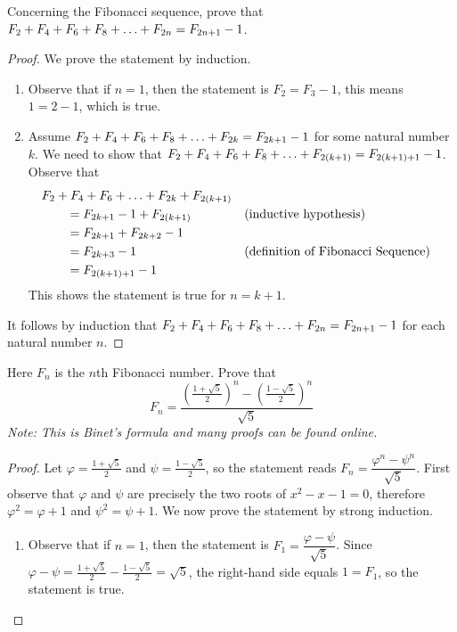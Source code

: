 \documentclass[DIN, pagenumber=false, fontsize=11pt, parskip=half]{scrartcl}
\begin{document}
\begin{problems}
    \problem Concerning the Fibonacci sequence, prove that $F_2 + F_4 + F_6 + F_8 + \mathellipsis + F_{2n} = F_{2n+1}-1$.
    \begin{proof}
        We prove the statement by induction.
        \begin{enumerate}
            \item Observe that if $n=1$, then the statement is $F_2 = F_{3}-1$, this means $1 = 2-1$, which is true.

            \item Assume $F_2 + F_4 + F_6 + F_8 + \mathellipsis + F_{2k} = F_{2k+1}-1$ for some natural number $k$. We need to show that $F_2 + F_4 + F_6 + F_8 + \mathellipsis + F_{2(k+1)} = F_{2(k+1)+1} - 1$. Observe that 
                \begin{align*}
                    \MoveEqLeft F_2+F_4+F_6+\mathellipsis + F_{2k} + F_{2(k+1)}\\
                    & = F_{2k+1} - 1 + F_{2(k+1)} && \text{(inductive hypothesis)}\\
                    & = F_{2k+1} + F_{2k+2} - 1\\
                    & = F_{2k+3} - 1 && \text{(definition of Fibonacci Sequence)}\\
                    & = F_{2(k+1)+1} - 1
                \end{align*}
                This shows the statement is true for $n = k + 1$.
        \end{enumerate}
        It follows by induction that $F_2+F_4+F_6+F_8+\mathellipsis + F_{2n} = F_{2n+1} - 1$ for each natural number $n$.
    \end{proof}

    \problem Here $F_n$ is the $n$th Fibonacci number. Prove that 
    \[
        F_n = \dfrac{\left(\frac{1+\sqrt{5}}{2}\right)^n - \left(\frac{1-\sqrt{5}}{2}\right)^n}{\sqrt{5}}
    \]
    \answer \textit{Note: This is Binet's formula and many proofs can be found online.}
    \begin{proof}
        Let $\varphi = \frac{1+\sqrt{5}}{2}$ and $\psi = \frac{1-\sqrt{5}}{2}$, so the statement reads $F_n = \dfrac{\varphi^n - \psi^n}{\sqrt{5}}$.
        First observe that $\varphi$ and $\psi$ are precisely the two roots of $x^2 - x - 1 = 0$, therefore $\varphi^2 = \varphi + 1$ and $\psi^2 = \psi + 1$.
        We now prove the statement by strong induction.
        \begin{enumerate}
            \item Observe that if $n=1$, then the statement is $F_1 = \dfrac{\varphi - \psi}{\sqrt{5}}$. Since $\varphi - \psi = \frac{1+\sqrt{5}}{2} - \frac{1-\sqrt{5}}{2} = \sqrt{5}$, the right-hand side equals $1 = F_1$, so the statement is true.


\end{enumerate}
\end{proof}
\end{problems}
\end{document}
